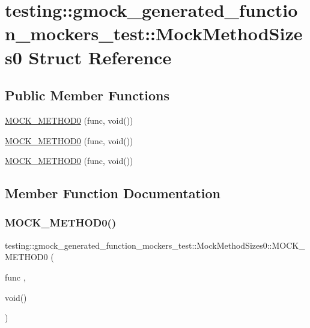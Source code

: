 \hypertarget{structtesting_1_1gmock__generated__function__mockers__test_1_1_mock_method_sizes0}{}\section{testing\+::gmock\+\_\+generated\+\_\+function\+\_\+mockers\+\_\+test\+::Mock\+Method\+Sizes0 Struct Reference}
\label{structtesting_1_1gmock__generated__function__mockers__test_1_1_mock_method_sizes0}
\subsection*{Public Member Functions}
\begin{DoxyCompactItemize}
\item 
\mbox{\hyperlink{structtesting_1_1gmock__generated__function__mockers__test_1_1_mock_method_sizes0_ad72a29f7a84b94e60a6697952d086ec9}{M\+O\+C\+K\+\_\+\+M\+E\+T\+H\+O\+D0}} (func, void())
\item 
\mbox{\hyperlink{structtesting_1_1gmock__generated__function__mockers__test_1_1_mock_method_sizes0_ad72a29f7a84b94e60a6697952d086ec9}{M\+O\+C\+K\+\_\+\+M\+E\+T\+H\+O\+D0}} (func, void())
\item 
\mbox{\hyperlink{structtesting_1_1gmock__generated__function__mockers__test_1_1_mock_method_sizes0_ad72a29f7a84b94e60a6697952d086ec9}{M\+O\+C\+K\+\_\+\+M\+E\+T\+H\+O\+D0}} (func, void())
\end{DoxyCompactItemize}


\subsection{Member Function Documentation}
\mbox{\label{structtesting_1_1gmock__generated__function__mockers__test_1_1_mock_method_sizes0_ad72a29f7a84b94e60a6697952d086ec9}} 
\subsubsection{\texorpdfstring{MOCK\_METHOD0()}{MOCK\_METHOD0()}\hspace{0.1cm}{\footnotesize\ttfamily [1/3]}}
{\footnotesize\ttfamily testing\+::gmock\+\_\+generated\+\_\+function\+\_\+mockers\+\_\+test\+::\+Mock\+Method\+Sizes0\+::\+M\+O\+C\+K\+\_\+\+M\+E\+T\+H\+O\+D0 (\begin{DoxyParamCaption}\item[{func}]{,  }\item[{void()}]{ }\end{DoxyParamCaption})}

